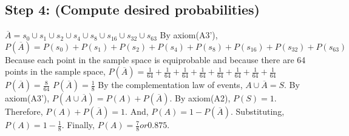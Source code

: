 \documentclass[a4paper,10pt]{article}
\begin{document}
\subsection{Step 4: (Compute desired probabilities)}
$ \overline{A} = s_{0} \cup s_{1} \cup s_{2} \cup s_{4} \cup s_{8} \cup s_{16} \cup s_{32} \cup s_{63} $ \newline
By axiom(A3'), \newline
$ P(\overline{A}) = P(s_{0}) + P(s_{1}) + P(s_{2}) + P(s_{4}) + P(s_{8}) + P(s_{16}) + P(s_{32}) + P(s_{63}) $ 
\newline
Because each point in the sample space is equiprobable and because there are 64 points in the sample space, \newline
$ P(\overline{A}) = \frac{1}{64} + \frac{1}{64} + \frac{1}{64} + \frac{1}{64} + \frac{1}{64} + \frac{1}{64} + 
\frac{1}{64} + \frac{1}{64} $ 
\newline
$ P(\overline{A}) = \frac{8}{64} $ \newline
$ P(\overline{A}) = \frac{1}{8} $ \newline
By the complementation law of events, $ A \cup \overline{A} = S. $ \newline
By axiom(A3'), $ P(A \cup \overline{A}) = P(A) + P(\overline{A}). $ \newline
By axiom(A2), $ P(S) = 1. $ \newline
Therefore, $ P(A) + P(\overline{A}) = 1. $ \newline
And, $ P(A) = 1 - P(\overline{A}). $ \newline
Substituting, $ P(A) = 1 - \frac{1}{8}. $ \newline
Finally, $ P(A) = \frac{7}{8} or 0.875. $ \newline 
\end{document}
